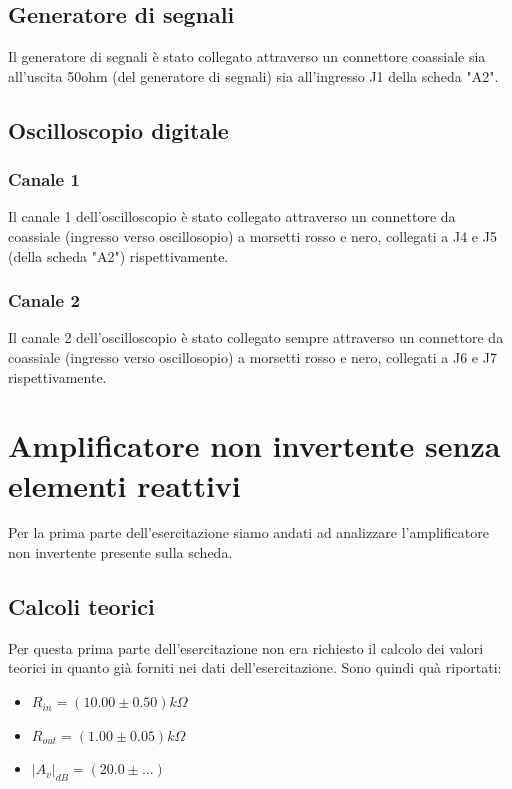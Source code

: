 \documentclass{article}
\begin{document}
\subsection{Generatore di segnali}
Il generatore di segnali è stato collegato attraverso un connettore coassiale sia all'uscita 50ohm (del generatore di segnali) sia all'ingresso J1 della scheda "A2".

\subsection{Oscilloscopio digitale}
\subsubsection{Canale 1} Il canale 1 dell'oscilloscopio è stato collegato attraverso un connettore da coassiale (ingresso verso oscillosopio) a morsetti rosso e nero, collegati a J4 e J5 (della scheda "A2") rispettivamente.
\subsubsection{Canale 2} Il canale 2 dell'oscilloscopio è stato collegato sempre attraverso un connettore da coassiale (ingresso verso oscillosopio) a morsetti rosso e nero, collegati a J6 e J7 rispettivamente.

\section{Amplificatore non invertente senza elementi reattivi}
Per la prima parte dell'esercitazione siamo andati ad analizzare l'amplificatore non invertente presente sulla scheda.

\subsection{Calcoli teorici}
Per questa prima parte dell'esercitazione non era richiesto il calcolo dei valori teorici in quanto già forniti nei dati dell'esercitazione.
Sono quindi quà riportati:
\begin{itemize}
\item \large $R_{in} = (10.00 \pm 0.50)k\Omega$
\item \large $R_{out} = (1.00 \pm 0.05)k\Omega$
\item \large ${|A_{v}|}_{dB} = (20.0 \pm ...)$
\end{itemize}
\end{document}

